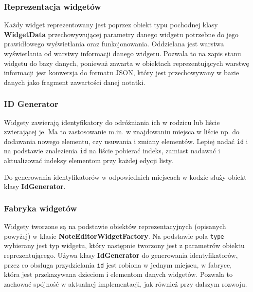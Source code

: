 \subsubsection{Reprezentacja widgetów}

Każdy widget reprezentowany jest poprzez obiekt typu pochodnej klasy \textbf{WidgetData} przechowywującej parametry danego widgetu potrzebne do jego prawidłowego wyświetlania oraz funkcjonowania. Oddzielana jest warstwa wyświetlania od warstwy informacji danego widgetu. Pozwala to na zapis stanu widgetu do bazy danych, ponieważ zawarta w obiektach reprezentujących warstwę informacji jest konwersja do formatu JSON, który jest przechowywany w bazie danych jako fragment zawartości danej notatki.

\subsubsection{ID Generator}

Widgety zawierają identyfikatory do odróżniania ich w rodzicu lub liście zwierającej je. Ma to zastosowanie m.in. w znajdowaniu miejsca w liście np. do dodawania nowego elementu, czy usuwania i zmiany elementów. Lepiej nadać \texttt{id} i na podstawie znalezienia \texttt{id} na liście pobierać indeks, zamiast nadawać i aktualizować indeksy elementom przy każdej edycji listy.

Do generowania identyfikatorów w odpowiednich miejscach w kodzie służy obiekt klasy \textbf{IdGenerator}.

\subsubsection{Fabryka widgetów}

Widgety tworzone są na podstawie obiektów reprezentacyjnych (opisanych powyżej) w klasie \textbf{NoteEditorWidgetFactory}. Na podstawie pola \texttt{type} wybierany jest typ widgetu, który następnie tworzony jest z parametrów obiektu reprezentującego. Używa klasy \textbf{IdGenerator} do generowania identyfikatorów, przez co obsługa przydzielania \texttt{id} jest robiona w jednym miejscu, w fabryce, która jest przekazywana dzieciom i elementom danych widgetów. Pozwala to zachować spójność w aktualnej implementacji, jak również przy dalszym rozwoju.